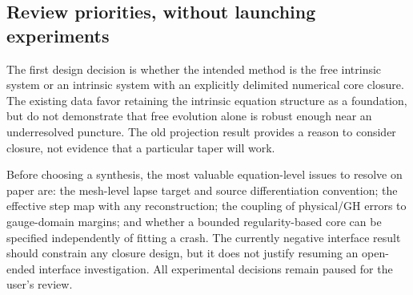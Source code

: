 \documentclass[11pt,letterpaper]{article}
\begin{document}
\subsection{Review priorities, without launching experiments}
The first design decision is whether the intended method is the free intrinsic system or an intrinsic system with an explicitly delimited numerical core closure. The existing data favor retaining the intrinsic equation structure as a foundation, but do not demonstrate that free evolution alone is robust enough near an underresolved puncture. The old projection result provides a reason to consider closure, not evidence that a particular taper will work.

Before choosing a synthesis, the most valuable equation-level issues to resolve on paper are: the mesh-level lapse target and source differentiation convention; the effective step map with any reconstruction; the coupling of physical/GH errors to gauge-domain margins; and whether a bounded regularity-based core can be specified independently of fitting a crash. The currently negative interface result should constrain any closure design, but it does not justify resuming an open-ended interface investigation. All experimental decisions remain paused for the user's review.

\clearpage
\end{document}
